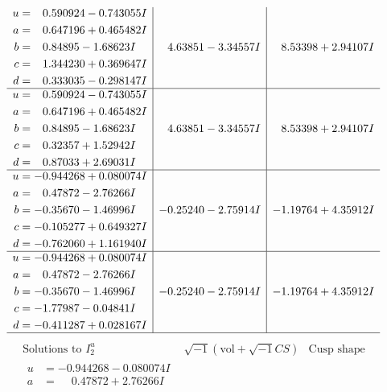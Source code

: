 \documentclass[1p]{elsarticle_modified}
\theoremstyle{definition}
\newcommand{\I}{\sqrt{-1}}
\begin{document}
$$\begin{array}{c|c|c}
\begin{aligned}
u &= \phantom{-}0.590924 - 0.743055 I \\
a &= \phantom{-}0.647196 + 0.465482 I \\
b &= \phantom{-}0.84895 - 1.68623 I \\
c &= \phantom{-}1.344230 + 0.369647 I \\
d &= \phantom{-}0.333035 - 0.298147 I\end{aligned}
 & \phantom{-}4.63851 - 3.34557 I & \phantom{-}8.53398 + 2.94107 I \\ \hline\begin{aligned}
u &= \phantom{-}0.590924 - 0.743055 I \\
a &= \phantom{-}0.647196 + 0.465482 I \\
b &= \phantom{-}0.84895 - 1.68623 I \\
c &= \phantom{-}0.32357 + 1.52942 I \\
d &= \phantom{-}0.87033 + 2.69031 I\end{aligned}
 & \phantom{-}4.63851 - 3.34557 I & \phantom{-}8.53398 + 2.94107 I \\ \hline\begin{aligned}
u &= -0.944268 + 0.080074 I \\
a &= \phantom{-}0.47872 - 2.76266 I \\
b &= -0.35670 - 1.46996 I \\
c &= -0.105277 + 0.649327 I \\
d &= -0.762060 + 1.161940 I\end{aligned}
 & -0.25240 - 2.75914 I & -1.19764 + 4.35912 I \\ \hline\begin{aligned}
u &= -0.944268 + 0.080074 I \\
a &= \phantom{-}0.47872 - 2.76266 I \\
b &= -0.35670 - 1.46996 I \\
c &= -1.77987 - 0.04841 I \\
d &= -0.411287 + 0.028167 I\end{aligned}
 & -0.25240 - 2.75914 I & -1.19764 + 4.35912 I\\
 \hline 
 \end{array}$$\newpage$$\begin{array}{c|c|c}  
\text{Solutions to }I^u_{2}& \I (\text{vol} + \sqrt{-1}CS) & \text{Cusp shape}\\
 \hline 
\begin{aligned}
u &= -0.944268 - 0.080074 I \\
a &= \phantom{-}0.47872 + 2.76266 I \\

\end{aligned}
\end{array}$$
\end{document}
